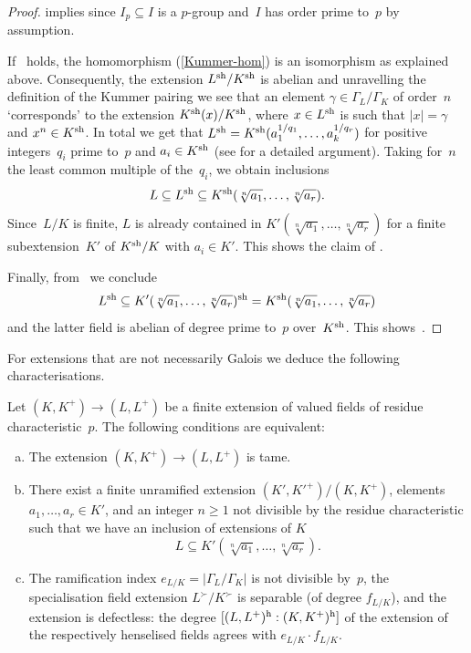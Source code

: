 \begin{proof}
     implies  since $I_p \subseteq I$ is a $p$-group and~$I$ has order prime to~$p$ by assumption.
    
    If~ holds, the homomorphism (\ref{Kummer-hom}) is an isomorphism as explained above.
    Consequently, the extension $L^{\rm sh}/K^{\rm sh}$ is abelian and unravelling the definition of the Kummer pairing we see that an element $\gamma \in \Gamma_L/\Gamma_K$ of order~$n$ `corresponds' to the extension $K^{\rm sh}(x)/K^{\rm sh}$, where $x \in L^{\rm sh}$ is such that $\lvert x \rvert = \gamma$ and $x^n \in K^{\rm sh}$.
    In total we get that $L^{\rm sh} = K^{\rm sh}(a_1^{1/q_1},\ldots,a_k^{1/q_r})$  for positive integers~$q_i$ prime to~$p$ and $a_i \in K^{\rm sh}$ (see \cite[Corollary 6.2.14]{GabberRamero} for a detailed argument).
    Taking for~$n$ the least common multiple of the~$q_i$, we obtain inclusions
    \[
      L \subseteq L^{\rm sh} \subseteq K^{\rm sh}(\sqrt[n]{a_1}, \ldots, \sqrt[n]{a_r}).      
    \]
    Since~$L/K$ is finite, $L$ is already contained in $K'(\sqrt[n]{a_1}, \ldots, \sqrt[n]{a_r})$ for a finite subextension~$K'$ of $K^{\rm sh}/K$ with $a_i \in K'$.
    This shows the claim of .
   
    Finally, from~ we conclude
    \[
     L^{\rm sh} \subseteq K'(\sqrt[n]{a_1}, \ldots, \sqrt[n]{a_r})^{\rm sh} = K^{\rm sh}(\sqrt[n]{a_1}, \ldots, \sqrt[n]{a_r})
    \]
    and the latter field is abelian of degree prime to~$p$ over~$K^{\rm sh}$.
    This shows~.
\end{proof}

For extensions that are not necessarily Galois we deduce the following characterisations.

\begin{lem} \label{lem:tameness-conditions}
    Let $(K,K^+) \to (L,L^+)$ be a finite extension of valued fields of residue characteristic~$p$. 
    The following conditions are equivalent: 
    \begin{enumerate}[(a)]
        \item 
        \label{lemitem:tame1}
        The extension $(K,K^+) \to (L,L^+)$ is tame.
        \item
        \label{lemitem:tame-abhyankar1}
        There exist a finite unramified extension $(K',K'^+)/(K,K^+)$, elements $a_1, \ldots, a_r\in K'$, and an integer $n\geq 1$ not divisible by the residue characteristic such that we have an inclusion of extensions of $K$
        \[ 
            L \subseteq K'(\sqrt[n]{a_1}, \ldots, \sqrt[n]{a_r}).
        \]
        \item 
        \label{lemitem:tame-numerical}
        The ramification index $e_{L/K} = \lvert \Gamma_L/\Gamma_K \rvert$ is not divisible by~$p$, the specialisation field extension $L^\succ/K^\succ$ is separable (of degree $f_{L/K}$), and the extension is defectless: the degree $[(L,L^+)^{{\rm h}}:(K,K^+)^{{\rm h}}]$ of the extension of the respectively henselised fields agrees with $e_{L/K} \cdot f_{L/K}$.
    \end{enumerate}
\end{lem}

